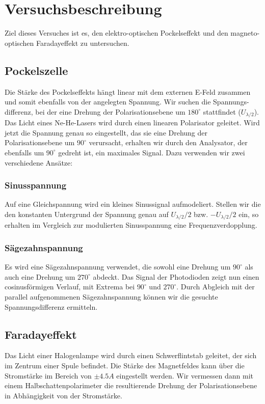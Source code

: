 \section{Versuchsbeschreibung}

Ziel dieses Versuches ist es, den elektro-optischen Pockelseffekt und den magneto-optischen Faradayeffekt zu untersuchen.
\subsection{Pockelszelle}
Die Stärke des Pockelseffekts hängt linear mit dem externen E-Feld zusammen und somit ebenfalls von der angelegten Spannung. Wir suchen die Spannungs-differenz, bei der eine Drehung der Polarisationsebene um $180^{\circ}$ stattfindet ($U_{\lambda/2}$). Das Licht eines Ne-He-Lasers wird durch einen linearen Polarisator geleitet. Wird jetzt die Spannung genau so eingestellt, das sie eine Drehung der Polarisationsebene um $90^{\circ}$ verursacht, erhalten wir durch den Analysator, der ebenfalls um $90^{\circ}$ gedreht ist, ein maximales Signal. Dazu verwenden wir zwei verschiedene Ansätze:
\subsubsection{Sinusspannung}
Auf eine Gleichspannung wird ein kleines Sinussignal aufmodeliert. Stellen wir die den konstanten Untergrund der Spannung genau auf $U_{\lambda/2}/2$ bzw. $-U_{\lambda/2}/2$ ein, so erhalten im Vergleich zur modulierten Sinusspannung eine Frequenzverdopplung.
\subsubsection{Sägezahnspannung}
Es wird eine Sägezahnspannung verwendet, die sowohl eine Drehung um $90^{\circ}$ als auch eine Drehung um $270^{\circ}$ abdeckt. Das Signal der Photodioden zeigt nun einen cosinusförmigen Verlauf, mit Extrema bei $90^{\circ}$ und $270^{\circ}$. Durch Abgleich mit der parallel aufgenommenen Sägezahnspannung können wir die gesuchte Spannungsdifferenz ermitteln.
 
\subsection{Faradayeffekt}
Das Licht einer Halogenlampe wird durch einen Schwerflintstab geleitet, der sich im Zentrum einer Spule befindet. Die Stärke des Magnetfeldes kann über die Stromstärke im Bereich von $\pm 4.5A$ eingestellt werden. Wir vermessen dann mit einem Halbschattenpolarimeter die resultierende Drehung der Polarisationsebene in Abhängigkeit von der Stromstärke.

